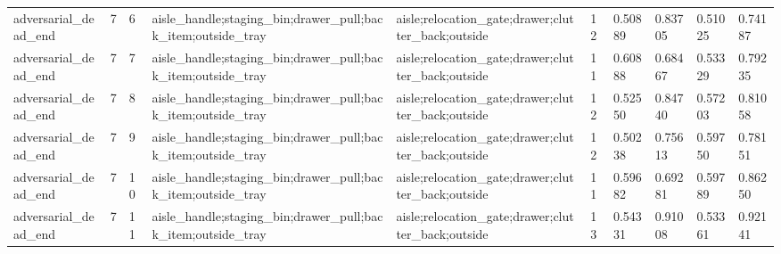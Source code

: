 \documentclass{article}
\begin{document}
\begin{table}[tbp]
{\begin{tabular}{llllllllll}
adversarial\_dead\_end & 7 & 6 & aisle\_handle;staging\_bin;drawer\_pull;back\_item;outside\_tray & aisle;relocation\_gate;drawer;clutter\_back;outside & 12 & 0.50889 & 0.83705 & 0.51025 & 0.74187 \\
adversarial\_dead\_end & 7 & 7 & aisle\_handle;staging\_bin;drawer\_pull;back\_item;outside\_tray & aisle;relocation\_gate;drawer;clutter\_back;outside & 11 & 0.60888 & 0.68467 & 0.53329 & 0.79235 \\
adversarial\_dead\_end & 7 & 8 & aisle\_handle;staging\_bin;drawer\_pull;back\_item;outside\_tray & aisle;relocation\_gate;drawer;clutter\_back;outside & 12 & 0.52550 & 0.84740 & 0.57203 & 0.81058 \\
adversarial\_dead\_end & 7 & 9 & aisle\_handle;staging\_bin;drawer\_pull;back\_item;outside\_tray & aisle;relocation\_gate;drawer;clutter\_back;outside & 12 & 0.50238 & 0.75613 & 0.59750 & 0.78151 \\
adversarial\_dead\_end & 7 & 10 & aisle\_handle;staging\_bin;drawer\_pull;back\_item;outside\_tray & aisle;relocation\_gate;drawer;clutter\_back;outside & 11 & 0.59682 & 0.69281 & 0.59789 & 0.86250 \\
adversarial\_dead\_end & 7 & 11 & aisle\_handle;staging\_bin;drawer\_pull;back\_item;outside\_tray & aisle;relocation\_gate;drawer;clutter\_back;outside & 13 & 0.54331 & 0.91008 & 0.53361 & 0.92141 \\
\bottomrule
\end{tabular}
}
\end{table}

\clearpage
\end{document}
